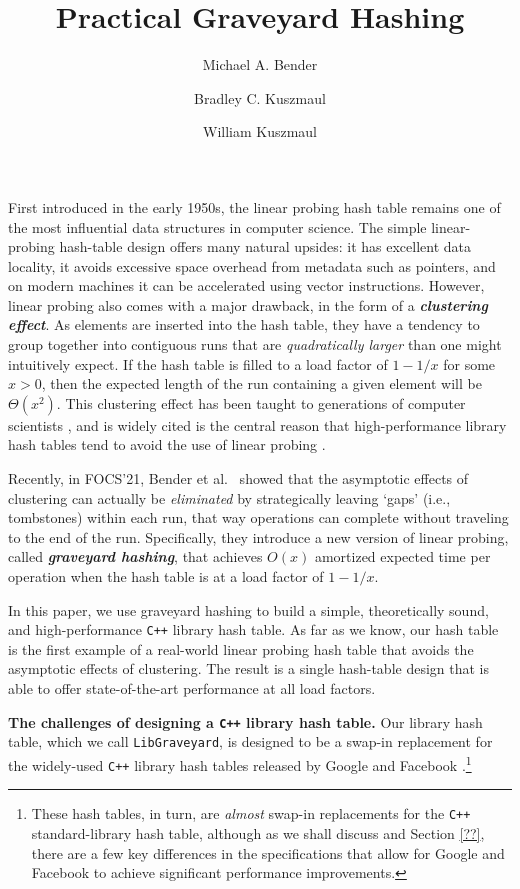 \documentclass[10pt]{article}
\title{Practical Graveyard Hashing}
\author{Michael A. Bender \and
        Bradley C. Kuszmaul \and
        William Kuszmaul}
\theoremstyle{remark}
\theoremstyle{remark}
\newcommand{\defn}[1]{\textbf{\emph{#1}}}
\renewcommand{\paragraph}[1]{\vspace{.2 cm} \noindent \textbf{#1}}
\begin{document}
\maketitle



First introduced in the early 1950s, the linear probing hash table remains one of the most influential data structures in computer science. The simple linear-probing hash-table design offers many natural upsides: it has excellent data locality, it avoids excessive space overhead from metadata such as pointers, and on modern machines it can be accelerated using vector instructions. However, linear probing also comes with a major drawback, in the form of a \defn{clustering effect}. As elements are inserted into the hash table, they have a tendency to group together into contiguous runs that are \emph{quadratically larger} than one might intuitively expect. If the hash table is filled to a load factor of $1 - 1 / x$ for some $x > 0$, then the expected length of the run containing a given element will be $\Theta(x^2)$. This clustering effect has been taught to generations of computer scientists \cite{...}, and is widely cited is the central reason that high-performance library hash tables tend to avoid the use of linear probing \cite{...}.

Recently, in FOCS'21, Bender et al.~\cite{?} showed that the asymptotic effects of clustering can actually be \emph{eliminated} by strategically leaving `gaps' (i.e., tombstones) within each run, that way operations can complete without traveling to the end of the run. Specifically, they introduce a new version of linear probing, called \defn{graveyard hashing}, that achieves $O(x)$ amortized expected time per operation when the hash table is at a load factor of $1 - 1/x$.

In this paper, we use graveyard hashing to build a simple, theoretically sound, and high-performance \texttt{C++} library hash table. As far as we know, our hash table is the first example of a real-world linear probing hash table that avoids the asymptotic effects of clustering. The result is a single hash-table design that is able to offer state-of-the-art performance at all load factors.

\paragraph{The challenges of designing a \texttt{C++} library hash table.}
Our library hash table, which we call \texttt{LibGraveyard}, is designed to be a swap-in replacement for the widely-used \texttt{C++} library hash tables released by Google \cite{?} and Facebook \cite{?}.\footnote{These hash tables, in turn, are \emph{almost} swap-in replacements for the \texttt{C++} standard-library hash table, although as we shall discuss and Section \ref{??}, there are a few key differences in the specifications that allow for Google and Facebook to achieve significant performance improvements.} 
\end{document}
